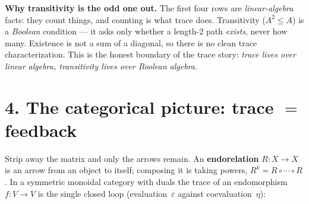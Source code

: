 \documentclass[11pt]{article}
\newcommand{\tr}{\operatorname{tr}}
\newcommand{\id}{\mathrm{id}}
\newcommand{\smallmat}[1]{\left(\begin{smallmatrix}#1\end{smallmatrix}\right)}
\begin{document}
\begin{center}
\end{center}

\noindent\textbf{Why transitivity is the odd one out.} The first four rows are
\emph{linear-algebra} facts: they count things, and counting is what trace does.
Transitivity ($A^{2}\le A$) is a \emph{Boolean} condition --- it asks only
whether a length-$2$ path \emph{exists}, never how many. Existence is not a sum
of a diagonal, so there is no clean trace characterization. This is the honest
boundary of the trace story: \emph{trace lives over linear algebra, transitivity
lives over Boolean algebra.}

\section*{4. The categorical picture: trace $=$ feedback}

Strip away the matrix and only the arrows remain. An \textbf{endorelation}
$R\colon X\to X$ is an arrow from an object to itself; composing it is taking
powers, $R^{k}=R\circ\cdots\circ R$. In a symmetric monoidal category with duals
the trace of an endomorphism $f\colon V\to V$ is the single closed loop
(evaluation~$\varepsilon$ against coevaluation~$\eta$):

\begin{center}
\qquad
{}
\end{center}
\end{document}
